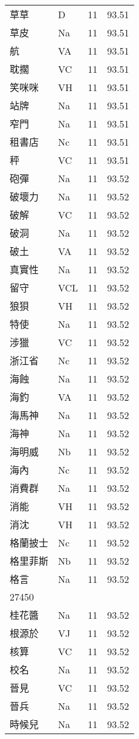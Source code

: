 \documentclass[twocolumn]{book}
\begin{document}
\begin{supertabular}{llrr}
草草 & D & 11 &  93.51\\
草皮 & Na & 11 &  93.51\\
航 & VA & 11 &  93.51\\
耽擱 & VC & 11 &  93.51\\
笑咪咪 & VH & 11 &  93.51\\
站牌 & Na & 11 &  93.51\\
窄門 & Na & 11 &  93.51\\
租書店 & Nc & 11 &  93.51\\
秤 & VC & 11 &  93.51\\
砲彈 & Na & 11 &  93.52\\
破壞力 & Na & 11 &  93.52\\
破解 & VC & 11 &  93.52\\
破洞 & Na & 11 &  93.52\\
破土 & VA & 11 &  93.52\\
真實性 & Na & 11 &  93.52\\
留守 & VCL & 11 &  93.52\\
狼狽 & VH & 11 &  93.52\\
特使 & Na & 11 &  93.52\\
涉獵 & VC & 11 &  93.52\\
浙江省 & Nc & 11 &  93.52\\
海蝕 & Na & 11 &  93.52\\
海釣 & VA & 11 &  93.52\\
海馬神 & Na & 11 &  93.52\\
海神 & Na & 11 &  93.52\\
海明威 & Nb & 11 &  93.52\\
海內 & Nc & 11 &  93.52\\
消費群 & Na & 11 &  93.52\\
消能 & VH & 11 &  93.52\\
消沈 & VH & 11 &  93.52\\
格蘭披士 & Nc & 11 &  93.52\\
格里菲斯 & Nb & 11 &  93.52\\
格言 & Na & 11 &  93.52\\
27450\\
桂花醬 & Na & 11 &  93.52\\
根源於 & VJ & 11 &  93.52\\
核算 & VC & 11 &  93.52\\
校名 & Na & 11 &  93.52\\
晉見 & VC & 11 &  93.52\\
晉兵 & Na & 11 &  93.52\\
時候兒 & Na & 11 &  93.52\\

\end{supertabular}
\end{document}
